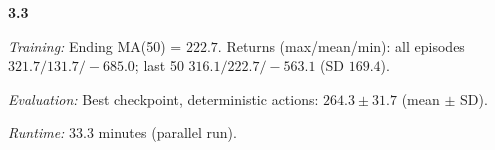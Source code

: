 \noindent\textbf{3.3}\par
\emph{Training:} Ending MA(50) = $222.7$. Returns (max/mean/min): all episodes $321.7/131.7/-685.0$; last 50 $316.1/222.7/-563.1$ (SD $169.4$).\par
\emph{Evaluation:} Best checkpoint, deterministic actions: $264.3\pm 31.7$ (mean $\pm$ SD).\par
\emph{Runtime:} $33.3$ minutes (parallel run).\par
